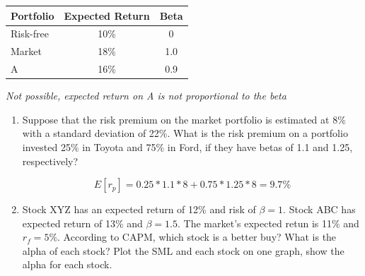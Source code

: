 \documentclass[11pt]{article}
\theoremstyle{definition}
\begin{document}
\begin{shaded}
            \begin{tabular}{lcc}
                \toprule
                Portfolio & Expected Return & Beta\\
                \midrule
                Risk-free & 10\% & 0\\
                Market & 18\% & 1.0\\
                A & 16\% & 0.9\\
                \bottomrule
            \end{tabular}

            \textit{Not possible, expected return on A is not proportional to the beta}

\end{shaded}


    \begin{shaded}
    
    \begin{enumerate}
        \item Suppose that the risk premium on the market portfolio is estimated at 8\% with 
        a standard deviation of 22\%.   What is the risk premium on a portfolio invested 25\% 
        in Toyota and 75\% in Ford, if they have betas of 1.1 and 1.25, respectively?

        $$E[r_p] = 0.25*1.1*8 + 0.75*1.25*8 = 9.7\%$$
        
        \item Stock XYZ has an expected return of 12\% and risk of $\beta=1$.   Stock ABC 
        has expected return of 13\% and $\beta=1.5$.   The market's expected retun is 11\% 
        and $r_f=5\%$.   According to CAPM, which stock is a better buy?   What is the alpha 
        of each stock?   Plot the SML and each stock on one graph, show the alpha for each 
        stock.
        
    \end{enumerate}

    \end{shaded}
\end{document}
